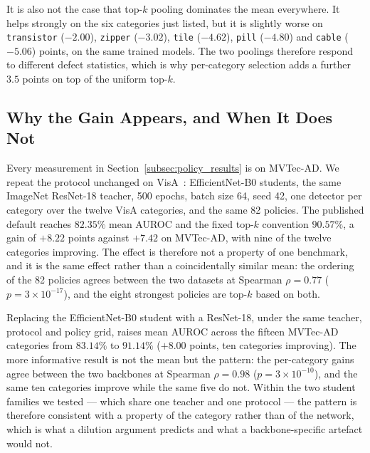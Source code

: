 It is also not the case that top-$k$ pooling dominates the mean everywhere. It
helps strongly on the six categories just listed, but it is slightly worse on
\texttt{transistor} ($-2.00$), \texttt{zipper} ($-3.02$), \texttt{tile}
($-4.62$), \texttt{pill} ($-4.80$) and \texttt{cable} ($-5.06$) points, on the
same trained models. The two poolings therefore respond to different defect
statistics, which is why per-category selection adds a further $3.5$ points on
top of the uniform top-$k$.

\subsection{Why the Gain Appears, and When It Does Not}
\label{subsec:mechanism}

Every measurement in Section~\ref{subsec:policy_results} is on MVTec-AD. We repeat
the protocol unchanged on VisA~\cite{zou2022visa}: EfficientNet-B0 students, the
same ImageNet ResNet-18 teacher, 500 epochs, batch size 64, seed 42, one detector
per category over the twelve VisA categories, and the same 82 policies. The
published default reaches $82.35\%$ mean AUROC and the fixed top-$k$ convention
$90.57\%$, a gain of $+8.22$ points against $+7.42$ on MVTec-AD, with nine of the
twelve categories improving. The effect is therefore not a property of one
benchmark, and it is the same effect rather than a coincidentally similar mean:
the ordering of the 82 policies agrees between the two datasets at Spearman
$\rho=0.77$ ($p=3\times10^{-17}$), and the eight strongest policies are top-$k$
based on both.

Replacing the EfficientNet-B0 student with a ResNet-18, under the same teacher,
protocol and policy grid, raises mean AUROC across the fifteen MVTec-AD
categories from $83.14\%$ to $91.14\%$ ($+8.00$ points, ten categories improving).
The more informative result is not the mean but the pattern: the per-category
gains agree between the two backbones at Spearman $\rho=0.98$
($p=3\times10^{-10}$), and the same ten categories improve while the same five do
not. Within the two student families we tested --- which share one teacher and
one protocol --- the pattern is therefore consistent with a property of the
category rather than of the network, which is what a dilution argument predicts
and what a backbone-specific artefact would not.

